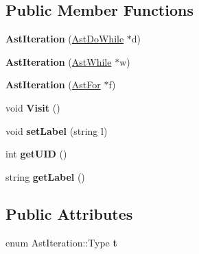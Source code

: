 \subsection*{Public Member Functions}
\begin{DoxyCompactItemize}
\item 
\hypertarget{classAstIteration_a9b98ddbdb8795a514c129a86fc00b561}{{\bfseries Ast\-Iteration} (\hyperlink{classAstDoWhile}{Ast\-Do\-While} $\ast$d)}\label{classAstIteration_a9b98ddbdb8795a514c129a86fc00b561}

\item 
\hypertarget{classAstIteration_aed79cf13c2e6376cab0a02b657ef6c87}{{\bfseries Ast\-Iteration} (\hyperlink{classAstWhile}{Ast\-While} $\ast$w)}\label{classAstIteration_aed79cf13c2e6376cab0a02b657ef6c87}

\item 
\hypertarget{classAstIteration_a87f1eaa5c3fc5b4562cbad3e54ff5061}{{\bfseries Ast\-Iteration} (\hyperlink{classAstFor}{Ast\-For} $\ast$f)}\label{classAstIteration_a87f1eaa5c3fc5b4562cbad3e54ff5061}

\item 
\hypertarget{classAstIteration_ae3e90f781890621279ff29b5481e0d4b}{void {\bfseries Visit} ()}\label{classAstIteration_ae3e90f781890621279ff29b5481e0d4b}

\item 
\hypertarget{classAST_a71d680856e95ff89f55d5311a552eba6}{void {\bfseries set\-Label} (string l)}\label{classAST_a71d680856e95ff89f55d5311a552eba6}

\item 
\hypertarget{classAST_ab7a5b1d9f1c2de0d98deb356f724a42c}{int {\bfseries get\-U\-I\-D} ()}\label{classAST_ab7a5b1d9f1c2de0d98deb356f724a42c}

\item 
\hypertarget{classAST_aee029be902fffc927d16ccb03eb922ad}{string {\bfseries get\-Label} ()}\label{classAST_aee029be902fffc927d16ccb03eb922ad}

\end{DoxyCompactItemize}
\subsection*{Public Attributes}
\begin{DoxyCompactItemize}
\item 
\hypertarget{classAstIteration_a41e8a7f05a840d8ddd333830f823314c}{enum Ast\-Iteration\-::\-Type {\bfseries t}}\label{classAstIteration_a41e8a7f05a840d8ddd333830f823314c}

\end{DoxyCompactItemize}

